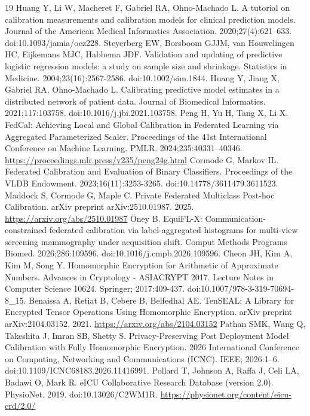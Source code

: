 \documentclass[11pt]{article}
\begin{document}
\begin{thebibliography}{19}
 Huang Y, Li W, Macheret F, Gabriel RA, Ohno-Machado L. A tutorial on calibration measurements and calibration models for clinical prediction models. Journal of the American Medical Informatics Association. 2020;27(4):621--633. doi:10.1093/jamia/ocz228.
 Steyerberg EW, Borsboom GJJM, van Houwelingen HC, Eijkemans MJC, Habbema JDF. Validation and updating of predictive logistic regression models: a study on sample size and shrinkage. Statistics in Medicine. 2004;23(16):2567-2586. doi:10.1002/sim.1844.
 Huang Y, Jiang X, Gabriel RA, Ohno-Machado L. Calibrating predictive model estimates in a distributed network of patient data. Journal of Biomedical Informatics. 2021;117:103758. doi:10.1016/j.jbi.2021.103758.
 Peng H, Yu H, Tang X, Li X. FedCal: Achieving Local and Global Calibration in Federated Learning via Aggregated Parameterized Scaler. Proceedings of the 41st International Conference on Machine Learning. PMLR. 2024;235:40331--40346. \url{https://proceedings.mlr.press/v235/peng24g.html}
 Cormode G, Markov IL. Federated Calibration and Evaluation of Binary Classifiers. Proceedings of the VLDB Endowment. 2023;16(11):3253-3265. doi:10.14778/3611479.3611523.
 Maddock S, Cormode G, Maple C. Private Federated Multiclass Post-hoc Calibration. arXiv preprint arXiv:2510.01987. 2025. \url{https://arxiv.org/abs/2510.01987}
 {\"O}ney B. EquiFL-X: Communication-constrained federated calibration via label-aggregated histograms for multi-view screening mammography under acquisition shift. Comput Methods Programs Biomed. 2026;286:109596. doi:10.1016/j.cmpb.2026.109596.
 Cheon JH, Kim A, Kim M, Song Y. Homomorphic Encryption for Arithmetic of Approximate Numbers. Advances in Cryptology - ASIACRYPT 2017. Lecture Notes in Computer Science 10624. Springer; 2017:409-437. doi:10.1007/978-3-319-70694-8\_15.
 Benaissa A, Retiat B, Cebere B, Belfedhal AE. TenSEAL: A Library for Encrypted Tensor Operations Using Homomorphic Encryption. arXiv preprint arXiv:2104.03152. 2021. \url{https://arxiv.org/abs/2104.03152}
 Pathan SMK, Wang Q, Takeshita J, Imran SB, Shetty S. Privacy-Preserving Post Deployment Model Calibration with Fully Homomorphic Encryption. 2026 International Conference on Computing, Networking and Communications (ICNC). IEEE; 2026:1--6. doi:10.1109/ICNC68183.2026.11416991.
 Pollard T, Johnson A, Raffa J, Celi LA, Badawi O, Mark R. eICU Collaborative Research Database (version 2.0). PhysioNet. 2019. doi:10.13026/C2WM1R. \url{https://physionet.org/content/eicu-crd/2.0/}

\end{thebibliography}
\end{document}
